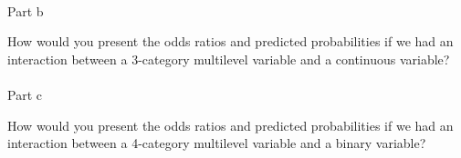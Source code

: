 \documentclass[
  letterpaper,
  DIV=11,
  numbers=noendperiod]{scrartcl}
\makeatletter
\let\oldparagraph\paragraph
\renewcommand{\paragraph}{
    \@ifstar
      \xxxParagraphStar
      \xxxParagraphNoStar
  }
\newcommand{\xxxParagraphStar}[1]{\oldparagraph*{#1}\mbox{}}
\newcommand{\xxxParagraphNoStar}[1]{\oldparagraph{#1}\mbox{}}
\makeatother
\begin{document}
\paragraph{Part b}\label{part-b-3}

How would you present the odds ratios and predicted probabilities if we
had an interaction between a 3-category multilevel variable and a
continuous variable?

\paragraph{Part c}\label{part-c-3}

How would you present the odds ratios and predicted probabilities if we
had an interaction between a 4-category multilevel variable and a binary
variable?
\end{document}
